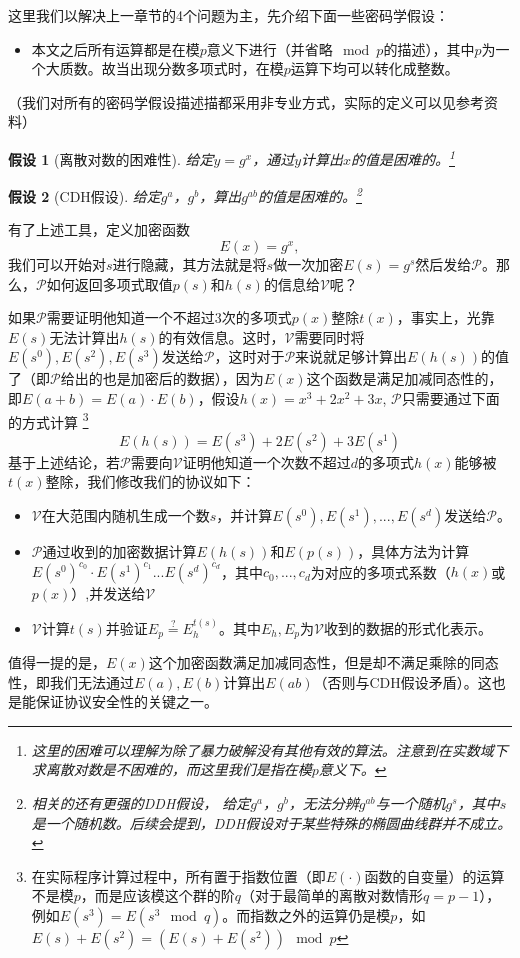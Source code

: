 \documentclass[12pt]{article}
\newcommand{\pp}{$\mathcal{P}$}
\newcommand{\vv}{$\mathcal{V}$}
\newtheorem{assumption}{假设}
\begin{document}
这里我们以解决上一章节的4个问题为主，先介绍下面一些密码学假设：
\begin{itemize}
	\item 本文之后所有运算都是在模$p$意义下进行（并省略$\mod p$的描述），其中$p$为一个大质数。故当出现分数多项式时，在模$p$运算下均可以转化成整数。
\end{itemize}
（我们对所有的密码学假设描述描都采用非专业方式，实际的定义可以见参考资料）
\begin{assumption}[离散对数的困难性]
	给定$y=g^x$，通过$y$计算出$x$的值是困难的。\footnote{这里的困难可以理解为除了暴力破解没有其他有效的算法。注意到在实数域下求离散对数是不困难的，而这里我们是指在模$p$意义下。}
\end{assumption}
\begin{assumption}[CDH假设]
	给定$g^a$，$g^b$，算出$g^{ab}$的值是困难的。\footnote{相关的还有更强的DDH假设，	给定$g^a$，$g^b$，无法分辨$g^{ab}$与一个随机$g^s$，其中$s$是一个随机数。后续会提到，DDH假设对于某些特殊的椭圆曲线群并不成立。}
\end{assumption}
有了上述工具，定义加密函数
$$E(x)=g^x,$$
我们可以开始对$s$进行隐藏，其方法就是将$s$做一次加密$E(s)=g^s$然后发给\pp。那么，\pp 如何返回多项式取值$p(s)$和$h(s)$的信息给\vv 呢？

如果\pp 需要证明他知道一个不超过3次的多项式$p(x)$整除$t(x)$，事实上，光靠$E(s)$无法计算出$h(s)$的有效信息。这时，\vv 需要同时将$E(s^0),E(s^2),E(s^3)$发送给\pp，这时对于\pp 来说就足够计算出$E(h(s))$的值了（即\pp 给出的也是加密后的数据），因为$E(x)$这个函数是满足加减同态性的，即$E(a+b)=E(a)\cdot E(b)$，假设$h(x)=x^3+2x^2+3x$, \pp 只需要通过下面的方式计算
\footnote{{\color{red} 在实际程序计算过程中，所有置于指数位置（即$E(\cdot)$函数的自变量）的运算不是模$p$，而是应该模这个群的阶$q$（对于最简单的离散对数情形$q=p-1$），例如$E(s^3)=E(s^3 \mod q)$。而指数之外的运算仍是模$p$，如$E(s)+E(s^2) = (E(s)+E(s^2)) \mod p $}}
$$E(h(s))=E(s^3)+2E(s^2)+3E(s^1)$$
基于上述结论，若\pp 需要向\vv 证明他知道一个次数不超过$d$的多项式$h(x)$能够被$t(x)$整除，我们修改我们的协议如下：
\begin{itemize}
	\item \vv 在大范围内随机生成一个数$s$，并计算$E(s^0),E(s^1),...,E(s^d)$发送给\pp。
	\item \pp 通过收到的加密数据计算$E(h(s))$和$E(p(s))$，具体方法为计算$E(s^0)^{c_0}\cdot E(s^1)^{c_1}...E(s^d)^{c_d}$，其中$c_0,...,c_d$为对应的多项式系数（$h(x)$或$p(x)$）,并发送给\vv
	\item \vv 计算$t(s)$并验证$E_p \overset{?}{=}E_h^{t(s)}$。其中$E_h,E_p$为\vv 收到的数据的形式化表示。
\end{itemize}
值得一提的是，$E(x)$这个加密函数满足加减同态性，但是却不满足乘除的同态性，即我们无法通过$E(a),E(b)$计算出$E(ab)$（否则与CDH假设矛盾）。这也是能保证协议安全性的关键之一。
\end{document}
